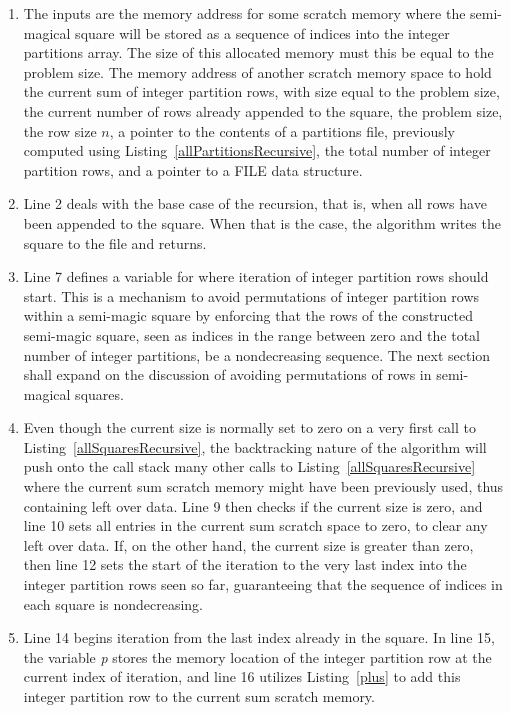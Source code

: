 \begin{enumerate}
\item The inputs are the memory address for some scratch memory where the semi-magical square will be stored as a sequence of indices into the integer partitions array. The size of this allocated memory must this be equal to the problem size. The memory address of another scratch memory space to hold the current sum of integer partition rows, with size equal to the problem size, the current number of rows already appended to the square, the problem size, the row size $n$, a pointer to the contents of a partitions file, previously computed using Listing~\ref{allPartitionsRecursive}, the total number of integer partition rows, and a pointer to a FILE data structure.
\item Line 2 deals with the base case of the recursion, that is, when all rows have been appended to the square. When that is the case, the algorithm writes the square to the file and returns.
\addtocounter{enumi}{4}
\item Line 7 defines a variable for where iteration of integer partition rows should start. This is a mechanism to avoid permutations of integer partition rows within a semi-magic square by enforcing that the rows of the constructed semi-magic square, seen as indices in the range between zero and the total number of integer partitions, be a nondecreasing sequence. The next section shall expand on the discussion of avoiding permutations of rows in semi-magical squares.
\addtocounter{enumi}{1}
\item Even though the current size is normally set to zero on a very first call to Listing~\ref{allSquaresRecursive}, the backtracking nature of the algorithm will push onto the call stack many other calls to Listing~\ref{allSquaresRecursive} where the current sum scratch memory might have been previously used, thus containing left over data. Line 9 then checks if the current size is zero, and line 10 sets all entries in the current sum scratch space to zero, to clear any left over data. If, on the other hand, the current size is greater than zero, then line 12 sets the start of the iteration to the very last index into the integer partition rows seen so far, guaranteeing that the sequence of indices in each square is nondecreasing.
\addtocounter{enumi}{4}
\item Line 14 begins iteration from the last index already in the square. In line 15, the variable \emph{p} stores the memory location of the integer partition row at the current index of iteration, and line 16 utilizes Listing~\ref{plus} to add this integer partition row to the current sum scratch memory.

\end{enumerate}
